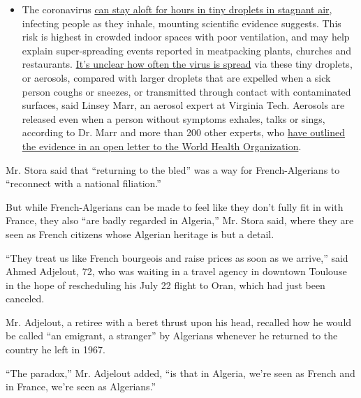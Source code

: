 \begin{itemize}
  \begin{itemize}
  \tightlist
  \item
    The coronavirus
    \href{https://www.nytimes3xbfgragh.onion/2020/07/04/health/239-experts-with-one-big-claim-the-coronavirus-is-airborne.html?action=click\&pgtype=Article\&state=default\&region=MAIN_CONTENT_3\&context=storylines_faq}{can
    stay aloft for hours in tiny droplets in stagnant air}, infecting
    people as they inhale, mounting scientific evidence suggests. This
    risk is highest in crowded indoor spaces with poor ventilation, and
    may help explain super-spreading events reported in meatpacking
    plants, churches and restaurants.
    \href{https://www.nytimes3xbfgragh.onion/2020/07/06/health/coronavirus-airborne-aerosols.html?action=click\&pgtype=Article\&state=default\&region=MAIN_CONTENT_3\&context=storylines_faq}{It's
    unclear how often the virus is spread} via these tiny droplets, or
    aerosols, compared with larger droplets that are expelled when a
    sick person coughs or sneezes, or transmitted through contact with
    contaminated surfaces, said Linsey Marr, an aerosol expert at
    Virginia Tech. Aerosols are released even when a person without
    symptoms exhales, talks or sings, according to Dr. Marr and more
    than 200 other experts, who
    \href{https://academic.oup.com/cid/article/doi/10.1093/cid/ciaa939/5867798}{have
    outlined the evidence in an open letter to the World Health
    Organization}.
  \end{itemize}
\end{itemize}

Mr. Stora said that ``returning to the bled'' was a way for
French-Algerians to ``reconnect with a national filiation.''

But while French-Algerians can be made to feel like they don't fully fit
in with France, they also ``are badly regarded in Algeria,'' Mr. Stora
said, where they are seen as French citizens whose Algerian heritage is
but a detail.

``They treat us like French bourgeois and raise prices as soon as we
arrive,'' said Ahmed Adjelout, 72, who was waiting in a travel agency in
downtown Toulouse in the hope of rescheduling his July 22 flight to
Oran, which had just been canceled.

Mr. Adjelout, a retiree with a beret thrust upon his head, recalled how
he would be called ``an emigrant, a stranger'' by Algerians whenever he
returned to the country he left in 1967.

``The paradox,'' Mr. Adjelout added, ``is that in Algeria, we're seen as
French and in France, we're seen as Algerians.''

